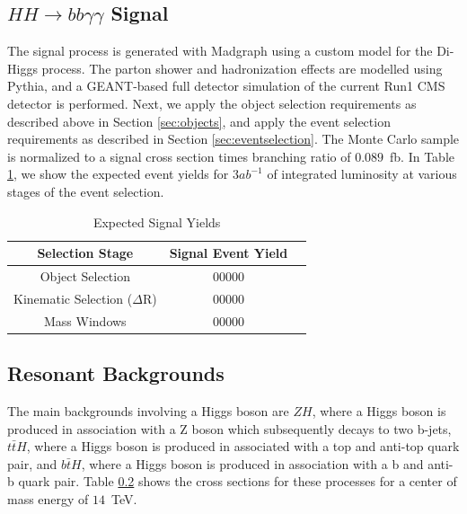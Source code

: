 \documentclass{cmspaper}
\begin{document}
\subsection{$HH \rightarrow bb\gamma\gamma$ Signal}
The signal process is generated with Madgraph using a custom model for the Di-Higgs process. The parton
shower and hadronization effects are modelled using Pythia, and a GEANT-based full detector simulation 
of the current Run1 CMS detector is performed. Next, we apply the object selection requirements as 
described above in Section \ref{sec:objects}, and apply the event selection requirements as described 
in Section \ref{sec:eventselection}. The Monte Carlo sample is normalized to a signal cross section
times branching ratio of $0.089$~fb. In Table \ref{tab:signalEventYields}, we show the 
expected event yields for $3 ab^{-1}$ of integrated luminosity at various stages of the event
selection.


\begin{table}[!ht]
\begin{center} 
\begin{tabular}{|c|c|c|}
\hline
Selection Stage       &  Signal Event Yield &  \\  \hline
Object Selection                &  00000       \\ 
Kinematic Selection ($\Delta$R) &  00000       \\ 
Mass Windows                    &  00000       \\ \hline

\end{tabular}
\caption{Expected Signal Yields }
\label{tab:signalEventYields}
\end{center}
\end{table}

\subsection{Resonant Backgrounds}
The main backgrounds involving a Higgs boson are $ZH$, where a Higgs boson is produced in association
with a Z boson which subsequently decays to two b-jets, $t\bar{t}H$, where a Higgs boson is produced
in associated with a top and anti-top quark pair, and $b\bar{t}H$, where a Higgs boson is produced in
association with a b and anti-b quark pair. Table \ref{} shows the cross sections for these processes
for a center of mass energy of $14$~TeV.
\end{document}
